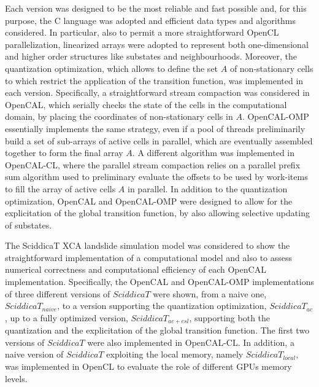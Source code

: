Each version was designed to be the most reliable and fast possible
and, for this purpose, the C language was adopted and efficient data
types and algorithms considered. In particular, also to permit a
more straightforward OpenCL parallelization, linearized arrays were
adopted to represent both one-dimensional and higher order
structures like substates and neighbourhoods. Moreover, the
quantization optimization, which allows to define the set $A$ of
non-stationary cells to which restrict the application of the
transition function, was implemented in each version. Specifically,
a straightforward stream compaction was considered in OpenCAL, which
serially checks the state of the cells in the computational domain,
by placing the coordinates of non-stationary cells in
$A$. OpenCAL-OMP essentially implements the same strategy, even if a
pool of threads preliminarily build a set of sub-arrays of active
cells in parallel, which are eventually assembled together to form
the final array $A$. A different algorithm was implemented in
OpenCAL-CL, where the parallel stream compaction relies on a
parallel prefix sum algorithm used to preliminary evaluate the
offsets to be used by work-items to fill the array of active cells
$A$ in parallel. In addition to the quantization optimization,
OpenCAL and OpenCAL-OMP were designed to allow for the explicitation
of the global transition function, by also allowing selective
updating of substates.

The SciddicaT XCA landslide simulation model was considered to show
the straightforward implementation of a computational model and also
to assess numerical correctness and computational efficiency of each
OpenCAL implementation. Specifically, the OpenCAL and OpenCAL-OMP
implementations of three different versions of $SciddicaT$ were
shown, from a naive one, $SciddicaT_{naive}$, to a version
supporting the quantization optimization, $SciddicaT_{ac}$, up to a
fully optimized version, $SciddicaT_{ac+esl}$, supporting both the
quantization and the explicitation of the global transition
function. The first two versions of $SciddicaT$ were also
implemented in OpenCAL-CL. In addition, a naive version of
$SciddicaT$ exploiting the local memory, namely $SciddicaT_{local}$,
was implemented in OpenCL to evaluate the role of different GPUs
memory levels.

